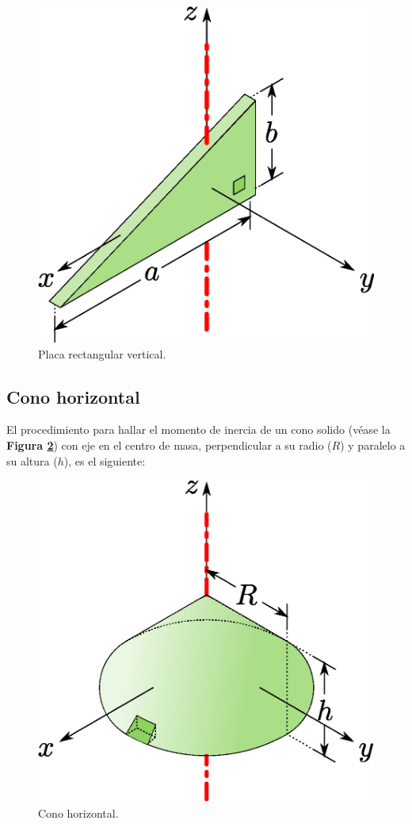 \begin{figure}
\centering
\includegraphics[scale=0.5]{resources/f12.eps}
\caption{Placa rectangular vertical.}
\label{figura12}
\end{figure}

\subsection{Cono horizontal}
El procedimiento para hallar el momento de inercia de un cono solido
(véase la \textbf{Figura \ref{figura19}}) con eje en el centro de masa,
perpendicular a su radio ($R$) y paralelo a su altura ($h$), es el siguiente:
 
\begin{figure}
\centering
\includegraphics[scale=0.5]{resources/f19.eps}
\caption{Cono horizontal.}
\label{figura19}
\end{figure}


